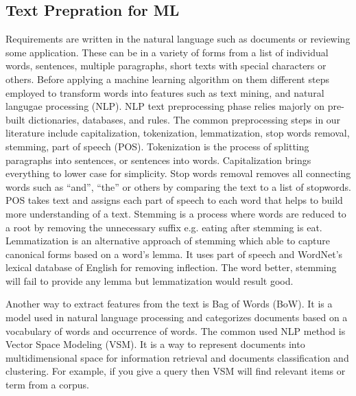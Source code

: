 \subsection{Text Prepration for ML}
\label{sec:preprocessing}

Requirements are written in the natural language such as documents or reviewing
some application. These can be in a variety of forms from a list of individual
words, sentences, multiple paragraphs, short texts with special characters or
others. Before applying a machine learning algorithm on them different steps
employed to transform words into features such as text mining, and natural langugae processing (NLP). NLP text preprocessing phase relies
majorly on pre-built dictionaries, databases, and rules. The common
preprocessing steps in our literature include capitalization, tokenization,
lemmatization, stop words removal, stemming, part of speech (POS). Tokenization
is the process of splitting paragraphs into sentences, or sentences into words.
Capitalization brings everything to lower case for simplicity. Stop words
removal removes all connecting words such as ``and'', ``the'' or others by
comparing the text to a list of stopwords. POS takes text and assigns each part of speech to each
word that helps to build more understanding of a text. Stemming is a process
where words are reduced to a root by removing the unnecessary suffix e.g. eating
after stemming is eat. Lemmatization is an alternative approach of stemming which
able to capture canonical forms based on a word's lemma. It uses part of speech
and WordNet’s lexical database of English for removing inflection. The word
better, stemming will fail to provide any lemma but lemmatization would result
good.

 	Another way to extract features from the text is Bag of Words (BoW). It is a
 model used in natural language processing and categorizes documents based on a
 vocabulary of words and occurrence of words. The common used NLP method is
 Vector Space Modeling (VSM). It is a way to represent documents into
 multidimensional space for information retrieval and documents classification
 and clustering. For example, if you give a query then VSM will find relevant items
 or term from a corpus.

